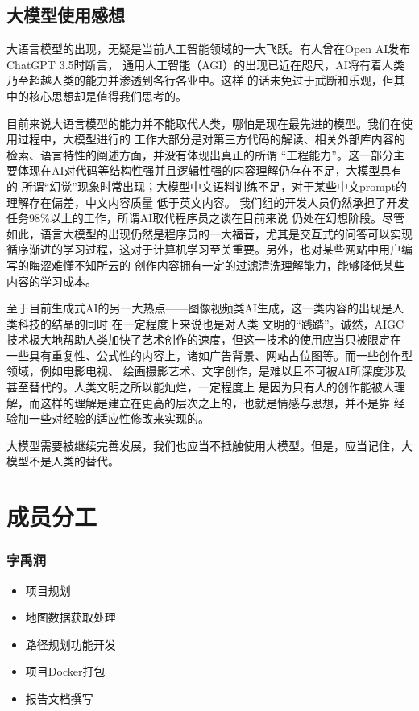 \documentclass{report}
\begin{document}
\section{大模型使用感想}
大语言模型的出现，无疑是当前人工智能领域的一大飞跃。有人曾在Open AI发布ChatGPT 3.5时断言，
通用人工智能（AGI）的出现已近在咫尺，AI将有着人类乃至超越人类的能力并渗透到各行各业中。这样
的话未免过于武断和乐观，但其中的核心思想却是值得我们思考的。
\par
目前来说大语言模型的能力并不能取代人类，哪怕是现在最先进的模型。我们在使用过程中，大模型进行的
工作大部分是对第三方代码的解读、相关外部库内容的检索、语言特性的阐述方面，并没有体现出真正的所谓
“工程能力”。这一部分主要体现在AI对代码等结构性强并且逻辑性强的内容理解仍存在不足，大模型具有的
所谓“幻觉”现象时常出现；大模型中文语料训练不足，对于某些中文prompt的理解存在偏差，中文内容质量
低于英文内容。
我们组的开发人员仍然承担了开发任务98\%以上的工作，所谓AI取代程序员之谈在目前来说
仍处在幻想阶段。尽管如此，语言大模型的出现仍然是程序员的一大福音，尤其是交互式的问答可以实现
循序渐进的学习过程，这对于计算机学习至关重要。另外，也对某些网站中用户编写的晦涩难懂不知所云的
创作内容拥有一定的过滤清洗理解能力，能够降低某些内容的学习成本。
\par
至于目前生成式AI的另一大热点——图像视频类AI生成，这一类内容的出现是人类科技的结晶的同时
在一定程度上来说也是对人类
文明的“践踏”。诚然，AIGC技术极大地帮助人类加快了艺术创作的速度，但这一技术的使用应当只被限定在
一些具有重复性、公式性的内容上，诸如广告背景、网站占位图等。而一些创作型领域，例如电影电视、
绘画摄影艺术、文字创作，是难以且不可被AI所深度涉及甚至替代的。人类文明之所以能灿烂，一定程度上
是因为只有人的创作能被人理解，而这样的理解是建立在更高的层次之上的，也就是情感与思想，并不是靠
经验加一些对经验的适应性修改来实现的。
\par
大模型需要被继续完善发展，我们也应当不抵触使用大模型。但是，应当记住，大模型不是人类的替代。

\chapter{成员分工}
\subsection*{字禹润}
\begin{itemize}
    \item 项目规划
    \item 地图数据获取处理
    \item 路径规划功能开发
    \item 项目Docker打包
    \item 报告文档撰写
\end{itemize}
\end{document}
